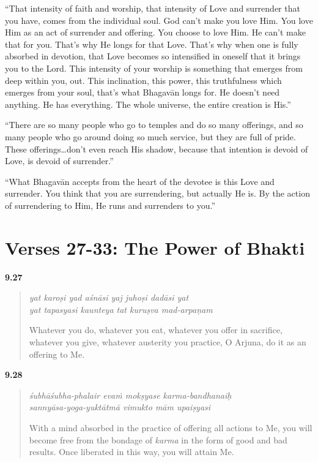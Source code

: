 \enquote{That intensity of faith and worship, that intensity of Love and surrender that you have, comes from the individual soul. God can’t make you love Him. You love Him as an act of surrender and offering. You choose to love Him. He can’t make that for you. That’s why He longs for that Love. That’s why when one is fully absorbed in devotion, that Love becomes so intensified in oneself that it brings you to the Lord. This intensity of your worship is something that emerges from deep within you, out. This inclination, this power, this truthfulness which emerges from your soul, that’s what Bhagavān longs for. He doesn’t need anything. He has everything. The whole universe, the entire creation is His.}

\enquote{There are so many people who go to temples and do so many offerings, and so many people who go around doing so much service, but they are full of pride. These offerings\ldots don’t even reach His shadow, because that intention is devoid of Love, is devoid of surrender.}

\enquote{What Bhagavān accepts from the heart of the devotee is this Love and surrender. You think that you are surrendering, but actually He is. By the action of surrendering to Him, He runs and surrenders to you.}

\section{Verses 27-33: The Power of Bhakti}\label{sec-verses-27-33-the-power-of-bhakti}


\par\noindent\textbf{9.27}\par
\begin{verse}
\textit{yat karoṣi yad aśnāsi yaj juhoṣi dadāsi yat} \\
\textit{yat tapasyasi kaunteya tat kuruṣva mad-arpaṇam}

\noindent Whatever you do, whatever you eat, whatever you offer in sacrifice, whatever you give, whatever austerity you practice, O Arjuna, do it as an offering to Me.
\end{verse}
\par



\par\noindent\textbf{9.28}\par
\begin{verse}
\textit{śubhāśubha-phalair evaṁ mokṣyase karma-bandhanaiḥ} \\
\textit{sannyāsa-yoga-yuktātmā vimukto mām upaiṣyasi}

\noindent With a mind absorbed in the practice of offering all actions to Me, you will become free from the bondage of \textit{karma} in the form of good and bad results. Once liberated in this way, you will attain Me.
\end{verse}
\par



